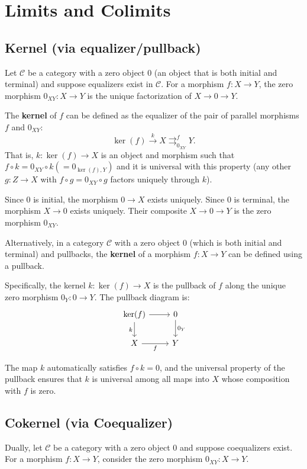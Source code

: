 \documentclass[11pt]{article}
\theoremstyle{definition}
\begin{document}
\section{Limits and Colimits}

\subsection{Kernel (via equalizer/pullback)}
Let $\mathcal{C}$ be a category with a zero object $0$ (an object that is both initial and terminal) and suppose equalizers exist in $\mathcal{C}$. For a morphism $f: X \to Y$, the zero morphism $0_{XY}: X \to Y$ is the unique factorization of $X \to 0 \to Y$.

The \textbf{kernel} of $f$ can be defined as the equalizer of the pair of parallel morphisms $f$ and $0_{XY}$:
\[
\ker(f) \xrightarrow{k} X \rightrightarrows^{f}_{0_{XY}} Y.
\]
That is, $k: \ker(f) \to X$ is an object and morphism such that $f \circ k = 0_{XY} \circ k (= 0_{\ker(f), Y})$ and it is universal with this property (any other $g: Z \to X$ with $f \circ g = 0_{XY} \circ g$ factors uniquely through $k$).

Since $0$ is initial, the morphism $0 \to X$ exists uniquely. Since $0$ is terminal, the morphism $X \to 0$ exists uniquely. Their composite $X \to 0 \to Y$ is the zero morphism $0_{XY}$.

Alternatively, in a category $\mathcal{C}$ with a zero object $0$ (which is both initial and terminal) and pullbacks, the \textbf{kernel} of a morphism $f: X \to Y$ can be defined using a pullback.

Specifically, the kernel $k: \ker(f) \to X$ is the pullback of $f$ along the unique zero morphism $0_Y: 0 \to Y$. The pullback diagram is:
\[
\begin{tikzcd}
\ker(f) \arrow[r] \arrow[d, "k"'] & 0 \arrow[d, "0_Y"] \\
X \arrow[r, "f"'] & Y
\end{tikzcd}
\]

The map $k$ automatically satisfies $f \circ k = 0$, and the universal property of the pullback ensures that $k$ is universal among all maps into $X$ whose composition with $f$ is zero.



\subsection{Cokernel (via Coequalizer)}
Dually, let $\mathcal{C}$ be a category with a zero object $0$ and suppose coequalizers exist. For a morphism $f: X \to Y$, consider the zero morphism $0_{XY}: X \to Y$.
\end{document}
